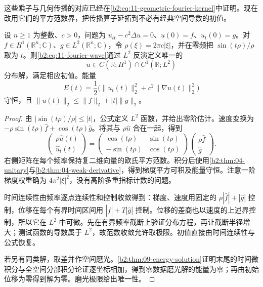 \ProseParagraphBreak

这些乘子与几何传播的对应已经在\eqref{b2:eq:11-geometric-fourier-kernel}中证明。现在改用它们的平方范数界，把传播算子延拓到不必有经典空间导数的初值。

\begin{theorem}[任意维能量解]\label{b2:thm:11-fourier-energy}
设 \(n\geq1\) 为整数、\(c>0\)，问题为 \(u_{tt}-c^2\Delta u=0\)、\(u(0)=f\)、\(u_t(0)=g\)。对 \(f\in H^1(\mathbb R^n;\mathbb C)\)、\(g\in L^2(\mathbb R^n;\mathbb C)\)，令 \(\rho(\xi)=2\pi c|\xi|\)，并在零频把 \(\sin(t\rho)/\rho\) 取为 \(t\)。则\eqref{b2:eq:11-fourier-wave}通过 \(L^2\) 反演定义唯一的
\[
 u\in C(\mathbb R;H^1)\cap C^1(\mathbb R;L^2)
\]
分布解，满足相应初值。能量
\[
 E(t)=\dfrac12\bigl(\|u_t(t)\|_2^2+c^2\|\nabla u(t)\|_2^2\bigr)
\]
守恒，且 \(\|u(t)\|_2\leq\|f\|_2+|t|\|g\|_2\)。
\end{theorem}
\begin{proof}
由 \(|\sin(t\rho)/\rho|\leq|t|\)，公式定义 \(L^2\) 函数，并给出零阶估计。速度变换为 \(-\rho\sin(t\rho)\widehat f+\cos(t\rho)\widehat g\)。将其与 \(\rho\widehat u\) 合在一起，得到
\[
 \begin{pmatrix}\rho\widehat u(t)\\\widehat u_t(t)\end{pmatrix}
 =\begin{pmatrix}\cos(t\rho)&\sin(t\rho)\\-\sin(t\rho)&\cos(t\rho)\end{pmatrix}
 \begin{pmatrix}\rho\widehat f\\\widehat g\end{pmatrix}.
\]
右侧矩阵在每个频率保持复二维向量的欧氏平方范数。积分后使用\cref{b2:thm:04-unitary}与\cref{b2:thm:04-weak-derivative}，得到梯度平方可积及能量守恒。注意一阶梯度权重确为 \(4\pi^2|\xi|^2\)，没有高阶多重指标计数的问题。

时间连续性由频率逐点连续性和控制收敛得到：梯度、速度用固定的 \(\rho|\widehat f|+|\widehat g|\) 控制，位移在每个有界时间区间用 \(|\widehat f|+T|\widehat g|\) 控制。位移的差商也以速度的上述界控制，所以它在 \(L^2\) 中可微。先在有界频率截断上验证分布方程，再让截断半径增大；测试函数的导数属于 \(L^2\)，故范数收敛允许取极限。初值直接由时间连续性与公式恢复。

若另有同类解，取差并作空间磨光。\cref{b2:thm:09-energy-solution}证明末尾的时间微积分与全空间分部积分论证逐坐标相加，得到零数据磨光解的能量为零；再由初始位移为零得到解为零。磨光极限给出唯一性。
\end{proof}

